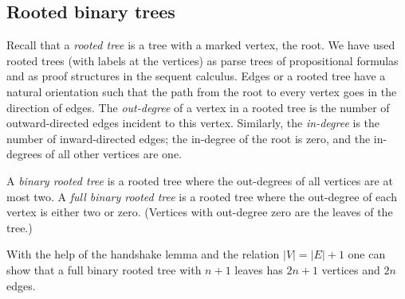 \subsection{Rooted binary trees}
Recall that a \emph{rooted tree} is a tree with a marked vertex, the root.
We have used rooted trees (with labels at the vertices) as parse trees of propositional formulas
and as proof structures in the sequent calculus.
Edges or a rooted tree have a natural orientation such that the path from the root to every vertex goes in the direction of edges.
The \emph{out-degree} of a vertex in a rooted tree is the number of outward-directed edges incident to this vertex.
Similarly, the \emph{in-degree} is the number of inward-directed edges; the in-degree of the root is zero, and the in-degrees of all other vertices are one.

A \emph{binary rooted tree} is a rooted tree where the out-degrees of all vertices are at most two.
A \emph{full binary rooted tree} is a rooted tree where the out-degree of each vertex is either two or zero.
(Vertices with out-degree zero are the leaves of the tree.)

With the help of the handshake lemma and the relation $|V| = |E| + 1$ one can show that
a full binary rooted tree with $n+1$ leaves has $2n+1$ vertices and $2n$ edges.
